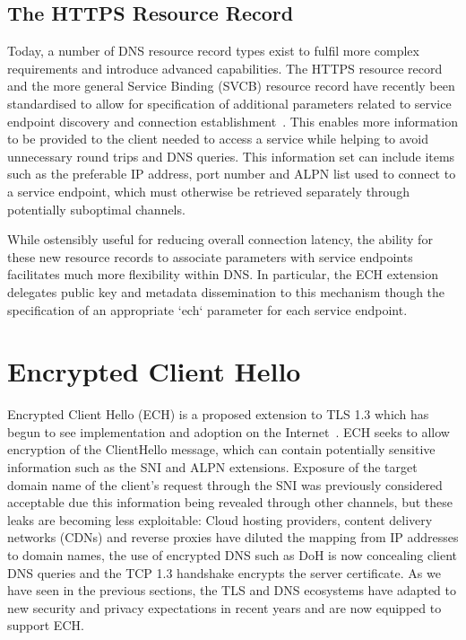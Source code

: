 \subsection{The HTTPS Resource Record}

Today, a number of DNS resource record types exist to fulfil more complex requirements and introduce advanced capabilities. The HTTPS resource record and the more general Service Binding (SVCB) resource record have recently been standardised to allow for specification of additional parameters related to service endpoint discovery and connection establishment~\cite{rfc9460}. This enables more information to be provided to the client needed to access a service while helping to avoid unnecessary round trips and DNS queries. This information set can include items such as the preferable IP address, port number and ALPN list used to connect to a service endpoint, which must otherwise be retrieved separately through potentially suboptimal channels.

While ostensibly useful for reducing overall connection latency, the ability for these new resource records to associate parameters with service endpoints facilitates much more flexibility within DNS. In particular, the ECH extension delegates public key and metadata dissemination to this mechanism though the specification of an appropriate `ech` parameter for each service endpoint.








\section{Encrypted Client Hello}

Encrypted Client Hello (ECH) is a proposed extension to TLS 1.3 which has begun to see implementation and adoption on the Internet~\cite{ietf-tls-esni-18, tsiatsikas2022measuring, CF-ECH}. ECH seeks to allow encryption of the ClientHello message, which can contain potentially sensitive information such as the SNI and ALPN extensions. Exposure of the target domain name of the client's request through the SNI was previously considered acceptable due this information being revealed through other channels, but these leaks are becoming less exploitable: Cloud hosting providers, content delivery networks (CDNs) and reverse proxies have diluted the mapping from IP addresses to domain names, the use of encrypted DNS such as DoH is now concealing client DNS queries and the TCP 1.3 handshake encrypts the server certificate. As we have seen in the previous sections, the TLS and DNS ecosystems have adapted to new security and privacy expectations in recent years and are now equipped to support ECH.


